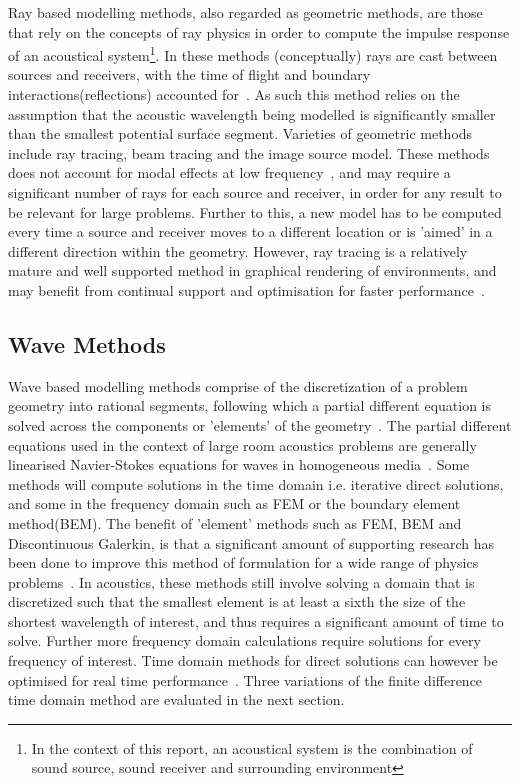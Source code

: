 \documentclass{svproc}
\begin{document}
Ray based modelling methods, also regarded as geometric methods, are those that rely on the concepts of ray physics in order to compute the impulse response of an acoustical system\footnote{In the context of this report, an acoustical system is the combination of sound source, sound receiver and surrounding environment}. In these methods (conceptually) rays are cast between sources and receivers, with the time of flight and boundary interactions(reflections) accounted for~\cite{Elorza2005}. As such this method relies on the assumption that the acoustic wavelength being modelled is significantly smaller than the smallest potential surface segment. Varieties of geometric methods include ray tracing, beam tracing and the image source model. These methods does not account for modal effects at low frequency~\cite{Rober2007}, and may require a significant number of rays for each source and receiver, in order for any result to be relevant for large problems. Further to this, a new model has to be computed every time a source and receiver moves to a different location or is 'aimed' in a different direction within the geometry. However, ray tracing is a relatively mature and well supported method in graphical rendering of environments, and may benefit from continual support and optimisation for faster performance~\cite{Rober2007}.


\subsection{Wave Methods}

Wave based modelling methods comprise of the discretization of a problem geometry into rational segments, following which a partial different equation is solved across the components or 'elements' of the geometry~\cite{Bilbao2004}. The partial different equations used in the context of large room acoustics problems are generally linearised Navier-Stokes equations for waves in homogeneous media~\cite{Rienstra1952a}. Some methods will compute solutions in the time domain i.e. iterative direct solutions, and some in the frequency domain such as FEM or the boundary element method(BEM). The benefit of 'element' methods such as FEM, BEM and Discontinuous Galerkin, is that a significant amount of supporting research has been done to improve this method of formulation for a wide range of physics problems~\cite{Zienkiewicz2013}. In acoustics, these methods still involve solving a domain that is discretized such that the smallest element is at least a sixth the size of the shortest wavelength of interest, and thus requires a significant amount of time to solve. Further more frequency domain calculations require solutions for every frequency of interest. Time domain methods for direct solutions can however be optimised for real time performance~\cite{Savioja2010}. Three variations of the finite difference time domain method are evaluated in the next section.
\newpage
\end{document}
